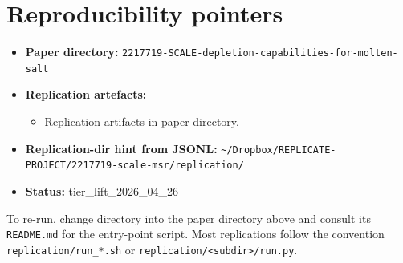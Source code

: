 \documentclass[11pt]{article}
\begin{document}
\section{Reproducibility pointers}\label{sec:repro}
\begin{itemize}
\item \textbf{Paper directory:} \texttt{2217719-SCALE-depletion-capabilities-for-molten-salt}
\item \textbf{Replication artefacts:}
\begin{itemize}
\item Replication artifacts in paper directory.
\end{itemize}
\item \textbf{Replication-dir hint from JSONL:} \texttt{\textasciitilde{}/Dropbox/REPLICATE-PROJECT/2217719-scale-msr/replication/}
\item \textbf{Status:} tier\_lift\_2026\_04\_26
\end{itemize}

To re-run, change directory into the paper directory above and consult its \texttt{README.md} for the entry-point script. Most replications follow the convention \texttt{replication/run\_*.sh} or \texttt{replication/<subdir>/run.py}.
\end{document}
